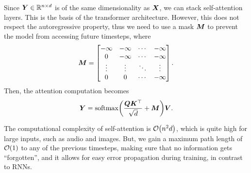 Since $\bm{Y} \in \mathbb{R}^{n \times d}$ is of the same dimensionality as $\bm{X}$, we can stack
self-attention layers. This is the basis of the transformer architecture. However, this does not
respect the autoregressive property, thus we need to use a mask $\bm{M}$ to prevent the model from
accessing future timesteps, where \[
    \bm{M} = \begin{bmatrix}
        -\infty & -\infty & \cdots & -\infty \\
        0       & -\infty & \cdots & -\infty \\
        \vdots  & \vdots  & \ddots & \vdots  \\
        0       & 0       & \cdots & -\infty
    \end{bmatrix}.
\]
Then, the attention computation becomes \[
    \mat{Y} = \mathrm{softmax}\lft( \frac{\mat{Q} \transpose{\mat{K}}}{\sqrt{d}} + \mat{M} \rgt) \mat{V}.
\]

The computational complexity of self-attention is $\bigo{n^2 d}$, which is quite high for large
inputs, such as audio and images. But, we gain a maximum path length of $\bigo{1}$ to any of the
previous timesteps, making sure that no information gets ``forgotten'', and it allows for easy
error propagation during training, in contrast to RNNs.
